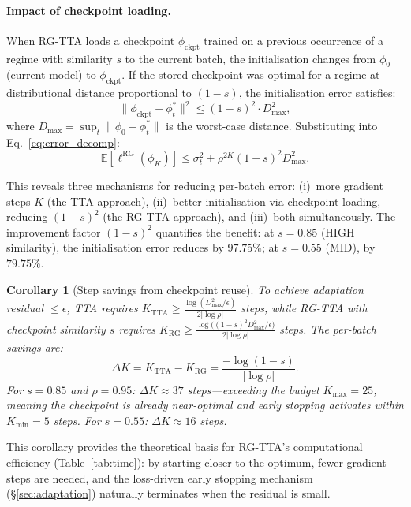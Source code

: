 \documentclass[journal]{IEEEtran}
\newtheorem{corollary}{Corollary}
\begin{document}
\paragraph{Impact of checkpoint loading.} When RG-TTA loads a checkpoint $\phi_{\text{ckpt}}$ trained on a previous occurrence of a regime with similarity $s$ to the current batch, the initialisation changes from $\phi_0$ (current model) to $\phi_{\text{ckpt}}$. If the stored checkpoint was optimal for a regime at distributional distance proportional to $(1-s)$, the initialisation error satisfies:
\begin{equation}
    \|\phi_{\text{ckpt}} - \phi^*_t\|^2 \leq (1 - s)^2 \cdot D^2_{\max},
    \label{eq:init_reduction}
\end{equation}
where $D_{\max} = \sup_t \|\phi_0 - \phi^*_t\|$ is the worst-case distance. Substituting into Eq.~\ref{eq:error_decomp}:
\begin{equation}
    \mathbb{E}[\ell^{\text{RG}}(\phi_K)] \leq \sigma^2_t + \rho^{2K}(1-s)^2 D^2_{\max}.
    \label{eq:rg_error}
\end{equation}

This reveals three mechanisms for reducing per-batch error: (i)~more gradient steps $K$ (the TTA approach), (ii)~better initialisation via checkpoint loading, reducing $(1-s)^2$ (the RG-TTA approach), and (iii)~both simultaneously. The improvement factor $(1-s)^2$ quantifies the benefit: at $s = 0.85$ (HIGH similarity), the initialisation error reduces by $97.75\%$; at $s = 0.55$ (MID), by $79.75\%$.

\begin{corollary}[Step savings from checkpoint reuse]
\label{cor:steps}
To achieve adaptation residual $\leq \epsilon$, TTA requires
$K_{\text{TTA}} \geq \frac{\log(D^2_{\max}/\epsilon)}{2|\log\rho|}$
steps, while RG-TTA with checkpoint similarity $s$ requires
$K_{\text{RG}} \geq \frac{\log\big((1-s)^2 D^2_{\max}/\epsilon\big)}{2|\log\rho|}$
steps. The per-batch savings are:
\begin{equation}
    \Delta K = K_{\text{TTA}} - K_{\text{RG}} = \frac{-\log(1-s)}{|\log\rho|}.
    \label{eq:step_savings}
\end{equation}
For $s = 0.85$ and $\rho = 0.95$: $\Delta K \approx 37$ steps---exceeding the budget $K_{\max} = 25$, meaning the checkpoint is already near-optimal and early stopping activates within $K_{\min} = 5$ steps. For $s = 0.55$: $\Delta K \approx 16$ steps.
\end{corollary}

This corollary provides the theoretical basis for RG-TTA's computational efficiency (Table~\ref{tab:time}): by starting closer to the optimum, fewer gradient steps are needed, and the loss-driven early stopping mechanism (\S\ref{sec:adaptation}) naturally terminates when the residual is small.
\end{document}

